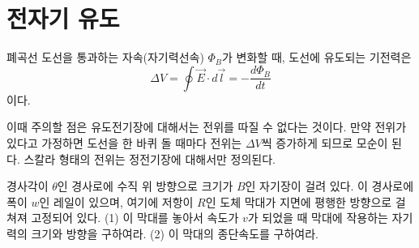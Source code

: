 \section{전자기 유도}
\begin{theorem}[패러데이 법칙]
폐곡선 도선을 통과하는 자속(자기력선속) $\Phi_B$가 변화할 때, 도선에 유도되는 기전력은 
\begin{equation}
\Delta V=\oint \vec{E}\cdot d\vec{l}=-\frac{d\Phi_B }{dt}
\end{equation}
이다. 
\end{theorem}
이때 주의할 점은 유도전기장에 대해서는 전위를 따질 수 없다는 것이다. 만약 전위가 있다고 가정하면 도선을 한 바퀴 돌 때마다 전위는 $\Delta V$씩 증가하게 되므로 모순이 된다. 스칼라 형태의 전위는 정전기장에 대해서만 정의된다.
\begin{exercise}
경사각이 $\theta$인 경사로에 수직 위 방향으로 크기가 $B$인 자기장이 걸려 있다. 이 경사로에 폭이 $w$인 레일이 있으며, 여기에 저항이 $R$인 도체 막대가 지면에 평행한 방향으로 걸쳐져 고정되어 있다. (1) 이 막대를 놓아서 속도가 $v$가 되었을 때 막대에 작용하는 자기력의 크기와 방향을 구하여라. (2) 이 막대의 종단속도를 구하여라.
\end{exercise}

